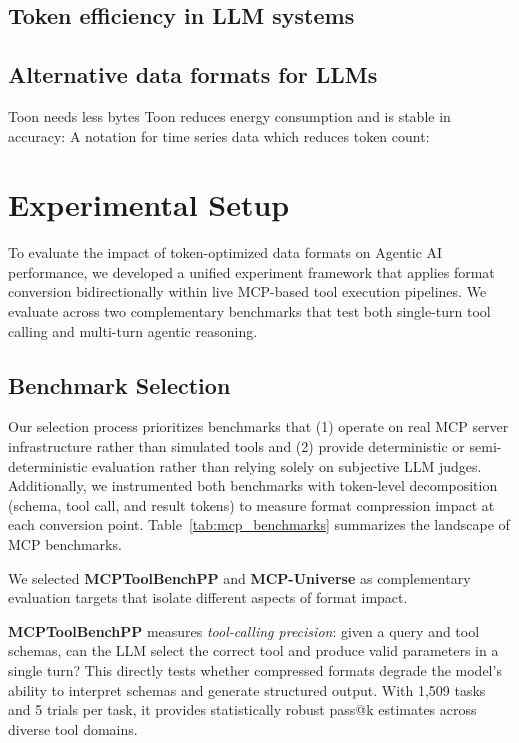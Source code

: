\documentclass[10pt,twocolumn,letterpaper]{article}
\begin{document}
\subsection{Token efficiency in LLM systems}


\subsection{Alternative data formats for LLMs}
Toon needs less bytes \citep{Lafalce_2025}
Toon reduces energy consumption  and is stable in accuracy: \cite{Masciari_Moscato_Napolitano_Orlando_Perillo_Russo_2026}
A notation for time series data which reduces token count: \citep{Mudbari_Bhagat_2026}

\section{Experimental Setup}
\label{sec:experimental_setup}

To evaluate the impact of token-optimized data formats on Agentic AI performance, we developed a unified experiment framework that applies format conversion bidirectionally within live MCP-based tool execution pipelines. We evaluate across two complementary benchmarks that test both single-turn tool calling and multi-turn agentic reasoning.

\subsection{Benchmark Selection}
\label{sec:benchmark_selection}

Our selection process prioritizes benchmarks that (1) operate on real MCP server infrastructure rather than simulated tools and (2) provide deterministic or semi-deterministic evaluation rather than relying solely on subjective LLM judges. Additionally, we instrumented both benchmarks with token-level decomposition (schema, tool call, and result tokens) to measure format compression impact at each conversion point. Table~\ref{tab:mcp_benchmarks} summarizes the landscape of MCP benchmarks.

We selected \textbf{MCPToolBenchPP} and \textbf{MCP-Universe} as complementary evaluation targets that isolate different aspects of format impact.

\textbf{MCPToolBenchPP} measures \textit{tool-calling precision}: given a query and tool schemas, can the LLM select the correct tool and produce valid parameters in a single turn? This directly tests whether compressed formats degrade the model's ability to interpret schemas and generate structured output. With 1,509 tasks and 5 trials per task, it provides statistically robust pass@k estimates across diverse tool domains.
\end{document}
